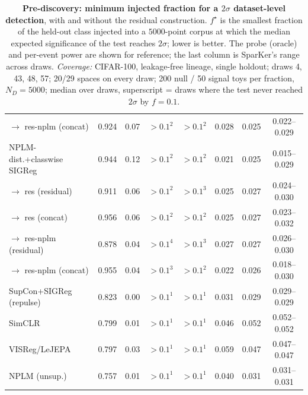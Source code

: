 \begin{table}[t]
\begin{tabular}{lcccccc c}
\quad $\to$ res-nplm (concat) & 0.924 & 0.07 & $>0.1^{2}$ & $>0.1^{2}$ & 0.028 & 0.025 & 0.022--0.029 \\
\addlinespace
NPLM-dist.+classwise SIGReg & 0.944 & 0.12 & $>0.1^{2}$ & $>0.1^{2}$ & 0.021 & 0.025 & 0.015--0.029 \\
\quad $\to$ res (residual) & 0.911 & 0.06 & $>0.1^{2}$ & $>0.1^{3}$ & 0.025 & 0.027 & 0.024--0.030 \\
\quad $\to$ res (concat) & 0.956 & 0.06 & $>0.1^{2}$ & $>0.1^{2}$ & 0.025 & 0.027 & 0.023--0.032 \\
\quad $\to$ res-nplm (residual) & 0.878 & 0.04 & $>0.1^{4}$ & $>0.1^{3}$ & 0.027 & 0.027 & 0.026--0.030 \\
\quad $\to$ res-nplm (concat) & 0.955 & 0.04 & $>0.1^{3}$ & $>0.1^{2}$ & 0.022 & 0.026 & 0.018--0.030 \\
\addlinespace
SupCon+SIGReg (repulse) & 0.823 & 0.00 & $>0.1^{1}$ & $>0.1^{1}$ & 0.031 & 0.029 & 0.029--0.029 \\
\addlinespace
SimCLR & 0.799 & 0.01 & $>0.1^{1}$ & $>0.1^{1}$ & 0.046 & 0.052 & 0.052--0.052 \\
\addlinespace
VISReg/LeJEPA & 0.797 & 0.03 & $>0.1^{1}$ & $>0.1^{1}$ & 0.059 & 0.047 & 0.047--0.047 \\
\addlinespace
NPLM (unsup.) & 0.757 & 0.01 & $>0.1^{1}$ & $>0.1^{1}$ & 0.040 & 0.031 & 0.031--0.031 \\
\bottomrule
\end{tabular}
\caption{\textbf{Pre-discovery: minimum injected fraction for a $2\sigma$ dataset-level detection}, with and without the residual construction. $f^\star$ is the smallest fraction of the held-out class injected into a $5000$-point corpus at which the median expected significance of the test reaches $2\sigma$; lower is better. The probe (oracle) and per-event power are shown for reference; the last column is SparKer's range across draws. \emph{Coverage:} CIFAR-100, leakage-free lineage, single holdout; draws {4, 43, 48, 57}; 20/29 spaces on every draw; 200 null / 50 signal toys per fraction, $N_D{=}5000$; median over draws, superscript = draws where the test never reached $2\sigma$ by $f{=}0.1$.}
\label{tab:sigma_pre_cifar100}
\end{table}
